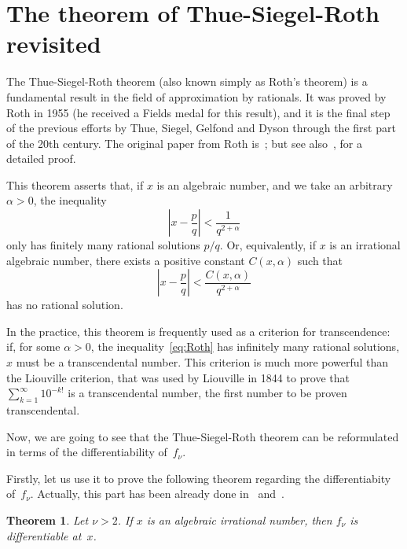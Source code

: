 \documentclass[11pt,a4paper,reqno]{amsart}
\theoremstyle{plain}
\newtheorem{theorem}{Theorem}
\theoremstyle{definition}
\begin{document}
\section{The theorem of Thue-Siegel-Roth revisited}

The Thue-Siegel-Roth theorem (also known simply as Roth's theorem) is a fundamental
result in the field of approximation by rationals.
It was proved by Roth in 1955 (he received a Fields medal for this result), 
and it is the final step of the previous efforts
by Thue, Siegel, Gelfond and Dyson through the first part of the 20th century.
The original paper from Roth is~\cite{Roth}; but see 
also~\cite[Chapter~6]{MiTa}, 
for a detailed proof.

This theorem asserts that, if $x$ is an algebraic number, 
and we take an arbitrary $\alpha > 0$, the inequality
\begin{equation}
\label{eq:Roth}
  \left| x - \frac{p}{q} \right| < \frac{1}{q^{2+\alpha}}
\end{equation}
only has finitely many rational solutions $p/q$. Or, equivalently,
if $x$ is an irrational algebraic number, there exists a positive constant 
$C(x,\alpha)$ such that
\begin{equation}
\label{eq:Roth-2}
  \left| x - \frac{p}{q} \right| 
  < \frac{C(x,\alpha)}{q^{2+\alpha}}
\end{equation}
has no rational solution. 

In the practice, this theorem is frequently used as a criterion for transcendence: 
if, for some $\alpha>0$, the inequality~\eqref{eq:Roth} has infinitely many 
rational solutions, $x$ must be a transcendental number. 
This criterion is much more powerful than the Liouville criterion, 
that was used by Liouville in 1844 to prove that $\sum_{k=1}^\infty 10^{-k!}$
is a transcendental number, the first number to be proven transcendental.

Now, we are going to see that the Thue-Siegel-Roth theorem can be reformulated 
in terms of the differentiability of~$f_\nu$.

Firstly, let us use it to prove the following theorem regarding the 
differentiabity of~$f_\nu$. Actually, this part has been already 
done in~\cite{He} and~\cite{Ny}.

\begin{theorem}
\label{theo:Roth-reformulated}
Let $\nu > 2$. 
If $x$ is an algebraic irrational number, then $f_\nu$ 
is differentiable at~$x$.
\end{theorem}
\end{document}

